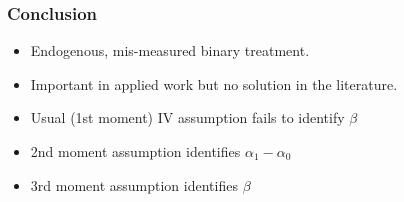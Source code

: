 \documentclass{beamer}
\begin{document}
\begin{frame}
  \frametitle{Conclusion}
  \begin{itemize}
    \item Endogenous, mis-measured binary treatment.
    \item Important in applied work but no solution in the literature.
      \item Usual (1st moment) IV assumption fails to identify $\beta$
      \item 2nd moment assumption identifies $\alpha_1 - \alpha_0$
      \item 3rd moment assumption identifies $\beta$ 
   \end{itemize}
\end{frame}
\appendix
\end{document}
